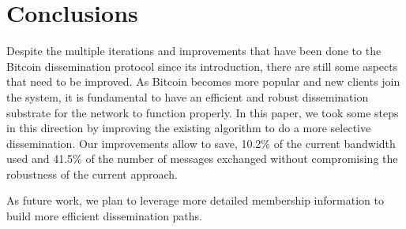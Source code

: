 \chapter{Conclusions}
\label{chap:conclusions}
Despite the multiple iterations and improvements  that have been done to the Bitcoin dissemination protocol since its introduction, there are still  some aspects that need to be improved.
As Bitcoin becomes more popular and new clients join the system, it is fundamental to have an efficient and robust dissemination substrate for the network to function properly.
In this paper, we took some steps in this direction by improving the existing algorithm to do a more selective dissemination.
Our improvements allow to save, 10.2\% of the current bandwidth used and 41.5\% of the number of messages exchanged without compromising the robustness of the current approach.

As future work, we plan to leverage more detailed membership information to build more efficient dissemination paths.
